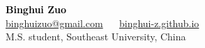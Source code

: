 \documentclass[margin, centered]{res}
\begin{document}
\begin{center}
    \hspace{-\hoffset}
    \vspace{3mm}
    \huge {\textcolor{black}{\textbf{Binghui Zuo}}}\\
    
    \hspace{-\hoffset}
    \large \href{mailto:binghuizuo@gmail.com}{binghuizuo@gmail.com} ~\textbullet~ \href{https://binghui-z.github.io/}{binghui-z.github.io} \\
    \hspace{-\hoffset}
    M.S. student, Southeast University, China
\end{center}
\end{document}
